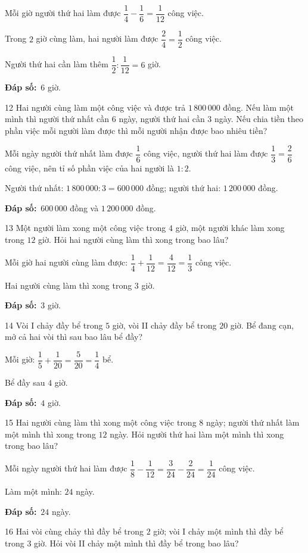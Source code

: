 \documentclass[11pt]{article}
\newif\ifsol \solfalse
\providecommand{\AnsWord}{Đáp số}
\newcommand{\dapso}[1]{\par\textbf{\AnsWord:}\ #1}
\newcommand{\probsol}[1]{%
  \begin{lrbox}{\solmeasure}\begin{minipage}{\dimexpr\linewidth-24pt\relax}#1\end{minipage}\end{lrbox}%
  \ifsol
    \begin{solbox}#1\end{solbox}%
  \else
    \setlength{\solht}{\dimexpr\ht\solmeasure+\dp\solmeasure+0.85cm\relax}%
    \ifdim\solht<1.35cm\setlength{\solht}{1.35cm}\fi
    \begin{tcolorbox}[colback=white,colframe=Line,boxrule=0.8pt,arc=5pt,
      left=8pt,right=8pt,top=4pt,bottom=4pt,height=\solht]{\footnotesize\color{Slate}\itshape\WorkWord}\end{tcolorbox}%
  \fi}
\newcommand{\gap}{\vspace{0.3cm}}
\def\WorkWord{Bài làm:}
\def\AnsWord{Đáp số}
\begin{document}
\probsol{
Mỗi giờ người thứ hai làm được $\dfrac14-\dfrac16=\dfrac1{12}$ công việc.\par Trong $2$ giờ cùng làm, hai người làm được $\dfrac24=\dfrac12$ công việc.\par
Người thứ hai cần làm thêm $\dfrac12:\dfrac1{12}=6$ giờ.
\dapso{$6$ giờ.}}
\gap
\begin{probbox}{12}{\relax}
Hai người cùng làm một công việc và được trả $1\,800\,000$ đồng. Nếu làm một mình thì người thứ nhất cần $6$ ngày, người thứ hai cần $3$ ngày. Nếu chia tiền theo phần việc mỗi người làm được thì mỗi người nhận được bao nhiêu tiền?
\end{probbox}
\probsol{
Mỗi ngày người thứ nhất làm được $\dfrac16$ công việc, người thứ hai làm được $\dfrac13=\dfrac26$ công việc, nên tỉ số phần việc của hai người là $1:2$.\par
Người thứ nhất: $1\,800\,000:3=600\,000$ đồng; người thứ hai: $1\,200\,000$ đồng.
\dapso{$600\,000$ đồng và $1\,200\,000$ đồng.}}
\gap
\begin{probbox}{13}{\relax}
Một người làm xong một công việc trong $4$ giờ, một người khác làm xong trong $12$ giờ. Hỏi hai người cùng làm thì xong trong bao lâu?
\end{probbox}
\probsol{
Mỗi giờ hai người cùng làm được: $\dfrac14+\dfrac1{12}=\dfrac4{12}=\dfrac13$ công việc.\par Hai người cùng làm thì xong trong $3$ giờ.
\dapso{$3$ giờ.}}
\gap
\begin{probbox}{14}{\relax}
Vòi I chảy đầy bể trong $5$ giờ, vòi II chảy đầy bể trong $20$ giờ. Bể đang cạn, mở cả hai vòi thì sau bao lâu bể đầy?
\end{probbox}
\probsol{
Mỗi giờ: $\dfrac15+\dfrac1{20}=\dfrac5{20}=\dfrac14$ bể.\par Bể đầy sau $4$ giờ.
\dapso{$4$ giờ.}}
\gap
\begin{probbox}{15}{\relax}
Hai người cùng làm thì xong một công việc trong $8$ ngày; người thứ nhất làm một mình thì xong trong $12$ ngày. Hỏi người thứ hai làm một mình thì xong trong bao lâu?
\end{probbox}
\probsol{
Mỗi ngày người thứ hai làm được $\dfrac18-\dfrac1{12}=\dfrac3{24}-\dfrac2{24}=\dfrac1{24}$ công việc.\par Làm một mình: $24$ ngày.
\dapso{$24$ ngày.}}
\gap
\begin{probbox}{16}{\relax}
Hai vòi cùng chảy thì đầy bể trong $2$ giờ; vòi I chảy một mình thì đầy bể trong $3$ giờ. Hỏi vòi II chảy một mình thì đầy bể trong bao lâu?
\end{probbox}
\end{document}
